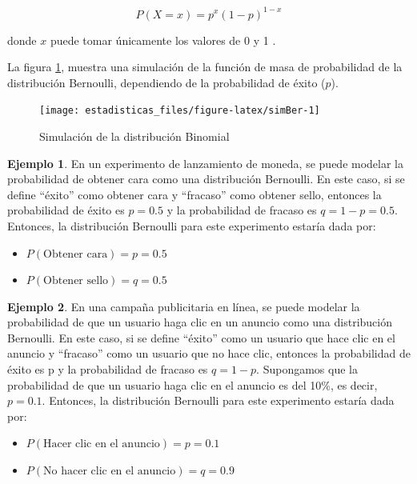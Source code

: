 \documentclass[
  11pt,
]{book}
\providecommand{\tightlist}{%
  \setlength{\itemsep}{0pt}\setlength{\parskip}{0pt}}
\theoremstyle{definition}
\theoremstyle{definition}
\newtheorem{example}{Ejemplo}[chapter]
\theoremstyle{definition}
\theoremstyle{definition}
\theoremstyle{remark}
\begin{document}
\begin{equation}
P(X = x) = p^x(1-p)^{1-x}
\label{eq:bernoulli}
\end{equation}

donde \(x\) puede tomar únicamente los valores de 0 y 1 \citep[página 105]{larsen}.

La figura \ref{fig:simBer}, muestra una simulación de la función de masa de probabilidad de la distribución Bernoulli, dependiendo de la probabilidad de éxito (\(p\)).

\begin{figure}

{\centering \texttt{[image: estadisticas\_files/figure-latex/simBer-1]} 

}

\caption{Simulación de la distribución Binomial}\label{fig:simBer}
\end{figure}

\begin{example}

En un experimento de lanzamiento de moneda, se puede modelar la probabilidad de obtener cara como una distribución Bernoulli. En este caso, si se define ``éxito'' como obtener cara y ``fracaso'' como obtener sello, entonces la probabilidad de éxito es \(p = 0.5\) y la probabilidad de fracaso es \(q = 1 - p = 0.5\). Entonces, la distribución Bernoulli para este experimento estaría dada por:

\begin{itemize}
\tightlist
\item
  \(P(\text{Obtener cara}) = p = 0.5\)
\item
  \(P(\text{Obtener sello}) = q = 0.5\)
\end{itemize}

\end{example}

\begin{example}

En una campaña publicitaria en línea, se puede modelar la probabilidad de que un usuario haga clic en un anuncio como una distribución Bernoulli. En este caso, si se define ``éxito'' como un usuario que hace clic en el anuncio y ``fracaso'' como un usuario que no hace clic, entonces la probabilidad de éxito es p y la probabilidad de fracaso es \(q = 1 - p\). Supongamos que la probabilidad de que un usuario haga clic en el anuncio es del 10\%, es decir, \(p = 0.1\). Entonces, la distribución Bernoulli para este experimento estaría dada por:

\begin{itemize}
\tightlist
\item
  \(P(\text{Hacer clic en el anuncio}) = p = 0.1\)
\item
  \(P(\text{No hacer clic en el anuncio}) = q = 0.9\)
\end{itemize}

\end{example}
\end{document}
